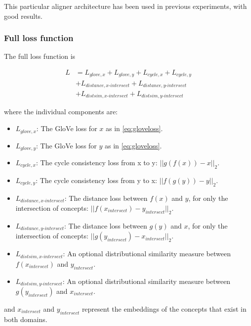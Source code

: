 This particular aligner architecture has been used in previous experiments, with good results. 

\subsubsection{Full loss function}

The full loss function is

\begin{equation}
\label{eq:fulllossfunction}
\begin{split}
L & = L_{glove, x} + L_{glove, y} + L_{cycle, x} + L_{cycle, y} \\
  & + L_{distance, x\text{-}intersect} + L_{distance, y\text{-}intersect} \\
  & + L_{distsim, x\text{-}intersect} + L_{distsim, y\text{-}intersect}
\end{split}
\end{equation}

where the individual components are: 

\begin{itemize}
    \item $L_{glove, x}$: The GloVe loss for $x$ as in \ref{eq:gloveloss}. 
    \item $L_{glove, y}$: The GloVe loss for $y$ as in \ref{eq:gloveloss}. 
    \item $L_{cycle, x}$: The cycle consistency loss from x to y: $||g(f(x)) - x||_2$.
    \item $L_{cycle, y}$: The cycle consistency loss from y to x: $||f(g(y)) - y||_2$.
    \item $L_{distance, x\text{-}intersect}$: The distance loss between $f(x)$ and $y$, for only the intersection of concepts: $||f(x_{intersect}) - y_{intersect}||_2$.
    \item $L_{distance, y\text{-}intersect}$: The distance loss between $g(y)$ and $x$, for only the intersection of concepts: $||g(y_{intersect}) - x_{intersect}||_2$.
    \item $L_{distsim, x\text{-}intersect}$: An optional distributional similarity measure between $f(x_{intersect})$ and $y_{intersect}$.
    \item $L_{distsim, y\text{-}intersect}$: An optional distributional similarity measure between $g(y_{intersect})$ and $x_{intersect}$.
\end{itemize}

and $x_{intersect}$ and $y_{intersect}$ represent the embeddings of the concepts that exist in both domains. 

